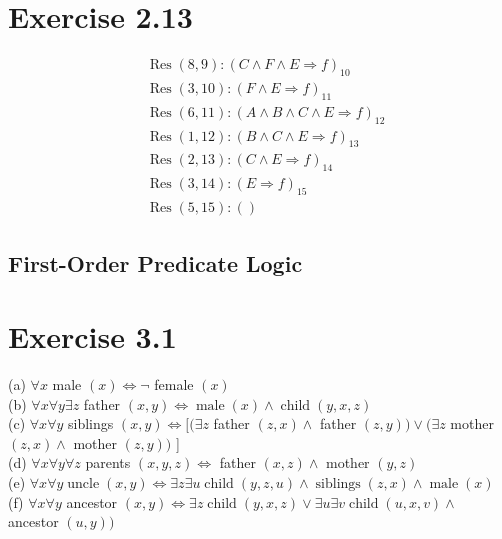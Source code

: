 \documentclass[10pt]{article}
\begin{document}
\section*{Exercise 2.13}
$$
\begin{aligned}
& \operatorname{Res}(8,9):(C \wedge F \wedge E \Rightarrow f)_{10} \\
& \operatorname{Res}(3,10):(F \wedge E \Rightarrow f)_{11} \\
& \operatorname{Res}(6,11):(A \wedge B \wedge C \wedge E \Rightarrow f)_{12} \\
& \operatorname{Res}(1,12):(B \wedge C \wedge E \Rightarrow f)_{13} \\
& \operatorname{Res}(2,13):(C \wedge E \Rightarrow f)_{14} \\
& \operatorname{Res}(3,14):(E \Rightarrow f)_{15} \\
& \operatorname{Res}(5,15):()
\end{aligned}
$$

\subsection*{First-Order Predicate Logic}
\section*{Exercise 3.1}
(a) $\forall x$ male $(x) \Leftrightarrow \neg$ female $(x)$\\
(b) $\forall x \forall y \exists z$ father $(x, y) \Leftrightarrow \operatorname{male}(x) \wedge \operatorname{child}(y, x, z)$\\
(c) $\forall x \forall y$ siblings $(x, y) \Leftrightarrow[(\exists z$ father $(z, x) \wedge$ father $(z, y)) \vee(\exists z$ mother $(z, x) \wedge$ mother $(z, y))$ ]\\
(d) $\forall x \forall y \forall z$ parents $(x, y, z) \Leftrightarrow$ father $(x, z) \wedge$ mother $(y, z)$\\
(e) $\forall x \forall y \operatorname{uncle}(x, y) \Leftrightarrow \exists z \exists u \operatorname{child}(y, z, u) \wedge \operatorname{siblings}(z, x) \wedge \operatorname{male}(x)$\\
(f) $\forall x \forall y$ ancestor $(x, y) \Leftrightarrow \exists z \operatorname{child}(y, x, z) \vee \exists u \exists v \operatorname{child}(u, x, v) \wedge$ ancestor $(u, y))$
\end{document}
